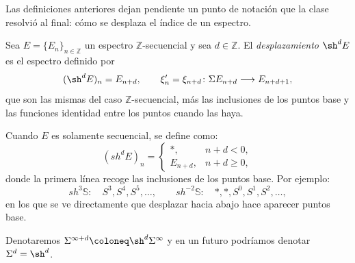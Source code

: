Las definiciones anteriores dejan pendiente un punto de notación que la clase resolvió al final: cómo se desplaza el índice de un espectro.

\begin{defi}\label{defi:desplazamiento}
Sea $E=\{E_n\}_{n\in\mathbb Z}$ un espectro $\mathbb Z$-secuencial y sea $d\in\mathbb Z$. El \emph{desplazamiento} $\sh^d E$ es el espectro definido por
\[
(\sh^dE)_n=E_{n+d},
\qquad
\xi'_n =\xi_{n+d}\colon\Sigma E_{n+d}\longrightarrow E_{n+d+1},
\]
que son las mismas del caso $\mathbb Z$-secuencial, más las inclusiones de los puntos base y las funciones identidad entre los puntos cuando las haya.
\end{defi}

Cuando $E$ es solamente secuencial, se define como:
\[
(sh^dE)_n=
\begin{cases}
*, & n+d<0,\\
E_{n+d}, & n+d\ge0,
\end{cases}
\]
donde la primera línea recoge las inclusiones de los puntos base. Por ejemplo:
\[
sh^3\mathbb S\colon\quad S^3,S^4,S^5,\dots,
\qquad
sh^{-2}\mathbb S\colon\quad *,*,S^0,S^1,S^2,\dots,
\]
en los que se ve directamente que desplazar hacia abajo hace aparecer puntos base.

Denotaremos $\Sigma^{\infty+d} \coloneq \sh^d\Sigma^\infty$ y en un futuro podríamos denotar $\Sigma^d = \sh^d$.

